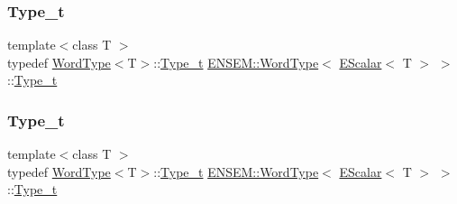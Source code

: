 \subsubsection{\texorpdfstring{Type\_t}{Type\_t}\hspace{0.1cm}{\footnotesize\ttfamily [1/3]}}
{\footnotesize\ttfamily template$<$class T $>$ \\
typedef \mbox{\hyperlink{structENSEM_1_1WordType}{Word\+Type}}$<$T$>$\+::\mbox{\hyperlink{structENSEM_1_1WordType_3_01EScalar_3_01T_01_4_01_4_adc30dc1892bde666c3cbe7a8ea951497}{Type\+\_\+t}} \mbox{\hyperlink{structENSEM_1_1WordType}{E\+N\+S\+E\+M\+::\+Word\+Type}}$<$ \mbox{\hyperlink{classENSEM_1_1EScalar}{E\+Scalar}}$<$ T $>$ $>$\+::\mbox{\hyperlink{structENSEM_1_1WordType_3_01EScalar_3_01T_01_4_01_4_adc30dc1892bde666c3cbe7a8ea951497}{Type\+\_\+t}}}

\mbox{\label{structENSEM_1_1WordType_3_01EScalar_3_01T_01_4_01_4_adc30dc1892bde666c3cbe7a8ea951497}} 
\subsubsection{\texorpdfstring{Type\_t}{Type\_t}\hspace{0.1cm}{\footnotesize\ttfamily [2/3]}}
{\footnotesize\ttfamily template$<$class T $>$ \\
typedef \mbox{\hyperlink{structENSEM_1_1WordType}{Word\+Type}}$<$T$>$\+::\mbox{\hyperlink{structENSEM_1_1WordType_3_01EScalar_3_01T_01_4_01_4_adc30dc1892bde666c3cbe7a8ea951497}{Type\+\_\+t}} \mbox{\hyperlink{structENSEM_1_1WordType}{E\+N\+S\+E\+M\+::\+Word\+Type}}$<$ \mbox{\hyperlink{classENSEM_1_1EScalar}{E\+Scalar}}$<$ T $>$ $>$\+::\mbox{\hyperlink{structENSEM_1_1WordType_3_01EScalar_3_01T_01_4_01_4_adc30dc1892bde666c3cbe7a8ea951497}{Type\+\_\+t}}}

\mbox{\label{structENSEM_1_1WordType_3_01EScalar_3_01T_01_4_01_4_adc30dc1892bde666c3cbe7a8ea951497}} 
